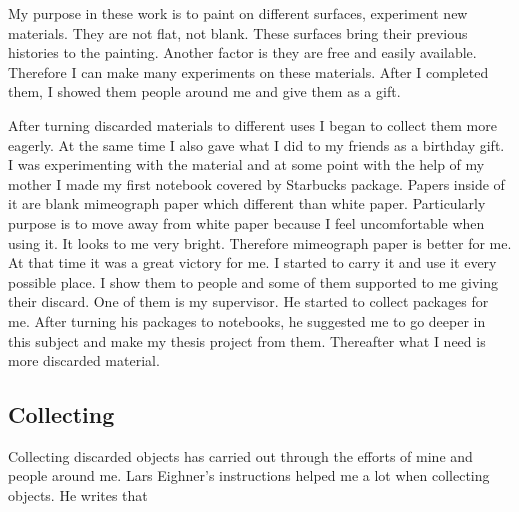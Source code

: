
My purpose in these work is to paint on different surfaces, experiment new materials. They are not flat, not blank. These surfaces bring their previous histories to the painting. Another factor is they are free and easily available. Therefore I can make many experiments on these materials. After I completed them, I showed them people around me and give them as a gift.

After turning discarded materials to different uses I began to collect them more eagerly. At the same time I also gave what I did to my friends as a birthday gift. I was experimenting with the material and at some point with the help of my mother I made my first notebook covered by Starbucks package. Papers inside of it are blank mimeograph paper which different than white paper. Particularly purpose is to move away from white paper because I feel uncomfortable when using it. It looks to me very bright. Therefore mimeograph paper is better for me. At that time it was a great victory for me. I started to carry it and use it every possible place. I show them to people and some of them supported to me giving their discard. One of them is my supervisor. He started to collect packages for me. After turning his packages to notebooks, he suggested me to go deeper in this subject and make my thesis project from them. Thereafter what I need is more discarded material.


\subsection{Collecting}
Collecting discarded objects has carried out through the efforts of mine and people around me. Lars Eighner's instructions helped me a lot when collecting objects. He writes that 

